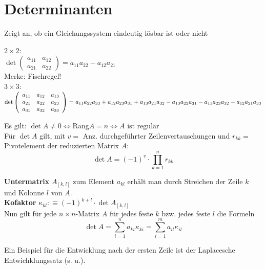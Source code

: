 \documentclass[a4paper,twocolumn]{article}
\begin{document}
\section{Determinanten}

	\begin{fdef}[Determinate]
		Zeigt an, ob ein Gleichungssystem eindeutig lösbar ist oder nicht
	\end{fdef}
	
	\begin{fsatz}
		\textbf{$2 \times 2:$}\\[1mm]
		$\det{\left(\begin{array}{cc}a_{11} & a_{12} \\ a_{21} & a_{22}\end{array}\right)}
			= a_{11}a_{22} - a_{12}a_{21}$\\[.6mm]
			Merke: Fischregel!\\[2mm]
		\textbf{$3 \times 3:$}\\[1mm]
		$\det{\left(\begin{array}{ccc}
					a_{11} & a_{12} & a_{13} \\
					a_{21} & a_{22} & a_{23} \\
					a_{31} & a_{32} & a_{33}
				\end{array}\right)} \\ =
				a_{11} a_{22} a_{33} + a_{12} a_{23} a_{31} + a_{13} a_{21} a_{32} 
					- a_{13} a_{22} a_{31} - a_{11} a_{23} a_{32} - a_{12} a_{21} a_{33}$
	\end{fsatz}
	
	\begin{fsatz}
		Es gilt: $\det{A} \ne 0 \Longleftrightarrow \text{Rang}A = n \Longleftrightarrow A \text{ ist regulär}$\\
		Für $\det{A}$ gilt, mit $v =$ Anz. durchgeführter Zeilenvertauschungen und $r_{kk} =$ Pivotelement
		der reduzierten Matrix $A$:
		$$\det{A} = (-1)^v \cdot \prod^n_{k=1} r_{kk}$$
	\end{fsatz}

	\begin{fsatz}
		\textbf{Untermatrix} $A_{[k,l]}$ zum Element $a_{kl}$ erhält man durch Streichen der Zeile $k$ und Kolonne $l$ von $A$.\\
		\textbf{Kofaktor} $\kappa_{kl} :\equiv (-1)^{k+l} \cdot \det{A_{[k,l]}}$\\[2mm]

		Nun gilt für jede $n \times n$-Matrix $A$ für jedes feste $k$ bzw. jedes feste $l$ die Formeln
		$$\det{A} = \sum^n_{i=1} a_{ki} \kappa_{ki} = \sum^m_{i=1} a_{il} \kappa_{il}$$
		
		Ein Beispiel für die Entwicklung nach der ersten Zeile ist der Laplacesche Entwichklungssatz (s. u.).
	\end{fsatz}
\end{document}
